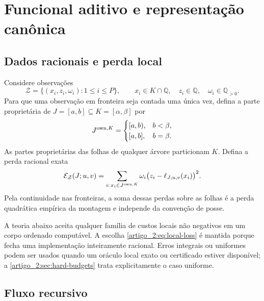 \section{Funcional aditivo e representação canônica}
\label{artigo_2:sec:functional}

\subsection{Dados racionais e perda local}

Considere observações
\begin{equation}
 \mathcal Z=\{(x_i,z_i,\omega_i):1\le i\le P\},
 \qquad
 x_i\in K\cap\mathbb Q,\quad z_i\in\mathbb Q,\quad
 \omega_i\in\mathbb Q_{>0}.
 \label{artigo_2:eq:rational-data}
\end{equation}
Para que uma observação em fronteira seja contada uma única vez, defina a
parte proprietária de $J=[a,b]\subseteq K=[\alpha,\beta]$ por
\begin{equation}
 J^{\mathrm{own},K}=
 \begin{cases}
 [a,b),&b<\beta,\\
 [a,b],&b=\beta.
 \end{cases}
 \label{artigo_2:eq:relative-ownership}
\end{equation}
As partes proprietárias das folhas de qualquer árvore particionam $K$.
Defina a perda racional exata
\begin{equation}
 \mathcal{E}_{\mathcal Z}(J;u,v)
 =\sum_{i:\,x_i\in J^{\mathrm{own},K}}
 \omega_i\bigl(z_i-\ell_{J;u,v}(x_i)\bigr)^2.
 \label{artigo_2:eq:local-loss}
\end{equation}
Pela continuidade nas fronteiras, a soma dessas perdas sobre as folhas é a
perda quadrática empírica da montagem e independe da convenção de posse.

A teoria abaixo aceita qualquer família de custos locais não negativos em um
corpo ordenado computável. A escolha \eqref{artigo_2:eq:local-loss} é mantida porque
fecha uma implementação inteiramente racional. Erros integrais ou uniformes
podem ser usados quando um oráculo local exato ou certificado estiver
disponível; a \cref{artigo_2:sec:hard-budgets} trata explicitamente o caso uniforme.

\subsection{Fluxo recursivo}

